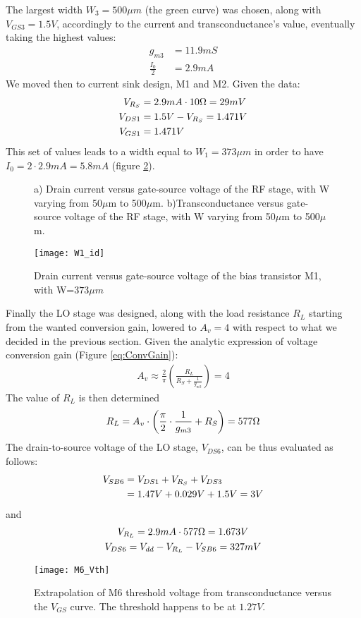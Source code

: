 The largest width  \(W_3=500\mu m\) (the green curve) was chosen, along with \(V_{GS3}=1.5V\), accordingly to the current and transconductance's value, eventually taking the highest values:
\begin{align}
g_{m3}&=11.9mS \nonumber \\
\frac{I_0}{2}&=2.9mA \nonumber
\end{align}
We moved then to current sink design, M1 and M2. Given the data:
\begin{align}
V_{R_S} &= 2.9mA\cdot 10\ohm=29mV \notag \\
V_{DS1}&=1.5V-V_{R_S}=1.471V \notag \\
V_{GS1}&=1.471V \notag
\end{align}
This set of values leads to a width equal to \(W_1=373\mu m\) in order to have \(I_0=2\cdot2.9mA=5.8mA\) (figure \ref{W1_id}).
\begin{figure}[H] 
	\centering
	\subfloat[][\emph{}]{\texttt{[image: W2\_id]}} \quad
	\subfloat[][\emph{}]{\texttt{[image: W2\_gm]}}
	\caption{ a) Drain current versus gate-source voltage of the RF stage, with W varying from 50\(\mu\)m to 500\(\mu\)m. b)Transconductance versus gate-source voltage of the RF stage, with W varying from 50\(\mu\)m to 500\(\mu\)m.}
	\label{fig:W_2_id_gm}
\end{figure}

\begin{figure}[H]
	\centering
	\texttt{[image: W1\_id]}
	\caption{Drain current versus gate-source voltage of the bias transistor M1, with W=\(373\mu m\)}
	\label{W1_id}
\end{figure}
Finally the LO stage was designed, along with the load resistance \(R_L\) starting from the wanted conversion gain, lowered to  \(A_v=4\) with respect to what we decided in the previous section. Given the analytic expression of voltage conversion gain (Figure \ref{eq:ConvGain}):
\begin{align}
	A_v \approx \frac{2}{\pi}\left( \frac{R_L}{R_S + \frac{1}{g_{m3}}}\right)=4 \nonumber
\end{align}
The value of \(R_L\) is then determined
\begin{align}
	R_L=A_v \cdot \left( \frac{\pi}{2} \cdot\frac{1}{g_{m3}} + R_S \right)=577 \ohm
\end{align}
The drain-to-source voltage of the LO stage, \(V_{DS6}\), can be thus evaluated as follows:
\begin{align}
	V_{SB6}&=V_{DS1}+V_{R_S}+V_{DS3} \notag\\
	&= 1.47V+0.029V+1.5V=3V \nonumber
\end{align}
and 
\begin{gather}	
V_{R_L}=2.9mA\cdot 577\ohm=1.673V \nonumber \\
V_{DS6}=V_{dd}-V_{R_L}-V_{SB6}=327mV \nonumber
\end{gather}
\begin{figure}[H]
	\centering
	\texttt{[image: M6\_Vth]}
	\caption{Extrapolation of M6 threshold voltage from transconductance versus the \(V_{GS}\) curve. The threshold happens to be at \(1.27V\).}
	\label{M6_Vth}
\end{figure}

